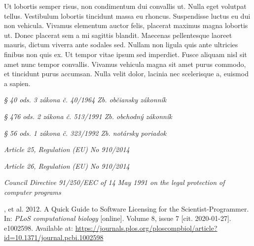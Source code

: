 \documentclass[thesismargins, english, thesislinespacing, twoside, openright, upjsfrontpage]{rnthesis}
\begin{document}
\zaver

Ut lobortis semper risus, non condimentum dui convallis ut. Nulla eget volutpat tellus. Vestibulum lobortis tincidunt massa eu rhoncus. Suspendisse luctus eu dui non vehicula. Vivamus elementum auctor felis, placerat maximus magna lobortis ut. Donec placerat sem a mi sagittis blandit. Maecenas pellentesque laoreet mauris, dictum viverra ante sodales sed. Nullam non ligula quis ante ultricies finibus non quis ex. Ut tempor vitae ipsum sed imperdiet. Fusce aliquam nisl sit amet nunc tempor convallis. Vivamus vehicula magna sit amet purus commodo, et tincidunt purus accumsan. Nulla velit dolor, lacinia nec scelerisque a, euismod a sapien.
%

\begin{thebibliography}{9}

  \emph{§ 40 ods. 3 zákona č. 40/1964 Zb. občiansky zákonník}

  \emph{§ 476 ods. 2 zákona č. 513/1991 Zb. obchodný zákonník}

  \emph{§ 56 ods. 1 zákona č. 323/1992 Zb. notársky poriadok}

  \emph{Article 25, Regulation (EU) No 910/2014}

  \emph{Article 26, Regulation (EU) No 910/2014}

  \emph{Council Directive 91/250/EEC of 14 May 1991 on the legal protection of computer programs}

  , et al. 2012. A Quick Guide to Software Licensing for the Scientist-Programmer. In: \emph{PLoS computational biology} [online]. Volume 8, issue 7 [cit. 2020-01-27]. e1002598. Available at: \url{https://journals.plos.org/ploscompbiol/article?id=10.1371/journal.pcbi.1002598}


\end{thebibliography}
\end{document}
